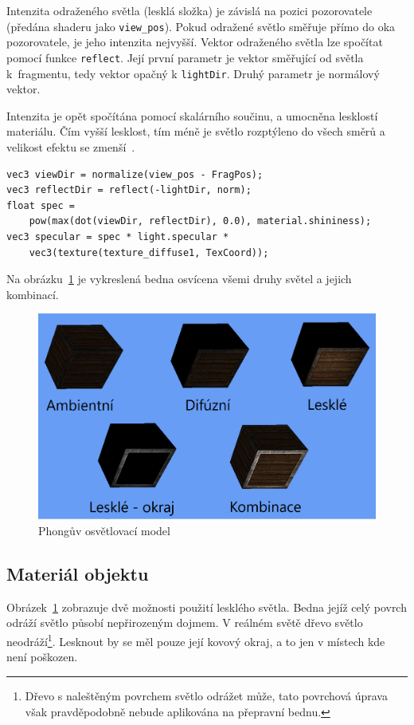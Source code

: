 \documentclass[thesis=M,czech]{FITthesis}[2019/12/23]
\begin{document}
Intenzita odraženého světla (lesklá složka) je závislá na pozici pozorovatele (předána shaderu jako \texttt{view\_pos}). Pokud odražené světlo směřuje přímo do oka pozorovatele, je jeho intenzita nejvyšší. Vektor odraženého světla lze spočítat pomocí funkce \texttt{reflect}. Její první parametr je vektor směřující od světla k~fragmentu, tedy vektor opačný k \texttt{lightDir}. Druhý parametr je normálový vektor.

Intenzita je opět spočítána pomocí skalárního součinu, a umocněna lesklostí materiálu. Čím vyšší lesklost, tím méně je světlo rozptýleno do všech směrů a velikost efektu se zmenší~\cite{lopgl_basic_light}.

\begin{verbatim}
vec3 viewDir = normalize(view_pos - FragPos);
vec3 reflectDir = reflect(-lightDir, norm);
float spec = 
    pow(max(dot(viewDir, reflectDir), 0.0), material.shininess);
vec3 specular = spec * light.specular * 
    vec3(texture(texture_diffuse1, TexCoord));
\end{verbatim}

Na obrázku~\ref{fig:phong} je vykreslená bedna osvícena všemi druhy světel a jejich kombinací.

\begin{figure}\centering
	\includegraphics[width=\textwidth]{images/phong}
	\caption[Phongův osvětlovací model]{Phongův osvětlovací model}\label{fig:phong}
\end{figure}

\subsection{Materiál objektu}

Obrázek~\ref{fig:phong} zobrazuje dvě možnosti použití lesklého světla. Bedna jejíž celý povrch odráží světlo působí nepřirozeným dojmem. V reálném světě dřevo světlo neodráží\footnote{Dřevo s naleštěným povrchem světlo odrážet může, tato povrchová úprava však pravděpodobně nebude aplikována na přepravní bednu.}. Lesknout by se měl pouze její kovový okraj, a to jen v místech kde není poškozen.
\end{document}
